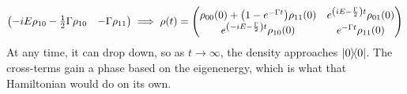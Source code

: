 \begin{example}
\[\begin{pmatrix}
        -iE \rho_{10} - \frac{1}{2} \Gamma \rho_{10} & - \Gamma \rho_{11}
    \end{pmatrix} \implies \rho(t) = \begin{pmatrix}
        \rho_{00}(0) + \qty(1 - e^{-\Gamma t})\rho_{11}(0) & e^{\qty(iE - \frac{\Gamma}{2})t }\rho_{01} (0) \\
        e^{\qty(-iE - \frac{\Gamma}{2})t }\rho_{10} (0) &  e^{- \Gamma t} \rho_{11}(0)\\
    \end{pmatrix} \]
    At any time, it can drop down, so as $t \to \infty$, the density approaches $\ketbra{0}$. The cross-terms gain a phase based on the eigenenergy,
    which is what that Hamiltonian would do on its own.
\end{example}